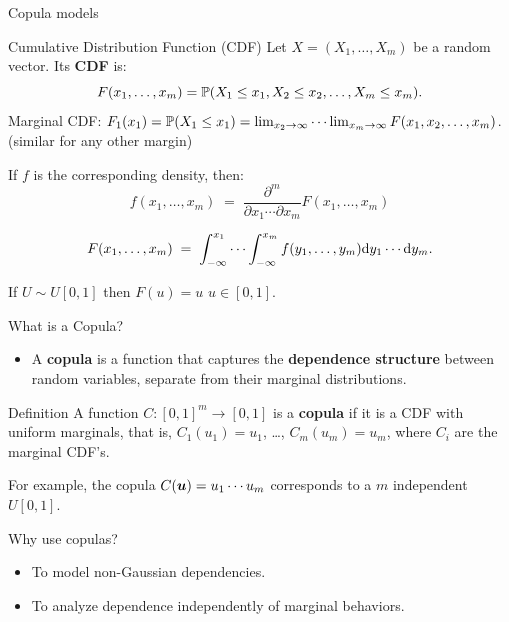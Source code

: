 \documentclass[11pt,handout,aspectratio=169]{beamer}
\begin{document}
\begin{frame}{}
	\begin{center}
		{\Huge \alert{Copula models}}
	\end{center}
\end{frame}

\begin{frame}{Cumulative Distribution Function (CDF)}
	Let $X=(X_1,\ldots,X_m)$ be a random vector.  Its \textbf{CDF} is: $$F(x_1,\ldots,x_m)=\P(X_1\leq x_1,X_2\leq x_2,\ldots,X_m\leq x_m).$$
	Marginal CDF: $F_1(x_1)=\P(X_1\leq x_1)=\lim_{x_2\to \infty}\cdots\lim_{x_m\to\infty}F(x_1,x_2,\ldots,x_m)$.
	(similar for any other margin)\\[5mm]	
	\begin{block}{}
	If $f$ is the corresponding density, then:
	$$
	f(x_1,\ldots,x_m)\;=\;\frac{\partial^m}{\partial x_1\cdots\partial x_m}F(x_1,\ldots,x_m)
	$$
	
	$$
	F(x_1,\ldots,x_m)\;=\;\int_{-\infty}^{x_1}\cdots \int_{-\infty}^{x_m} f(y_1,\ldots,y_m){\rm d}y_1\cdots {\rm d} y_m. 
	$$		
	\end{block}
		If $U\sim U[0,1]$ then $F(u)=u$ $u\in [0,1]$.

\end{frame}


\begin{frame}{What is a Copula?}
\begin{itemize}
    \item A \textbf{copula} is a function that captures the \textbf{dependence structure} between random variables, separate from their marginal distributions.
\end{itemize}
\begin{alertblock}{Definition}
	A function $C : [0, 1]^m \to [0, 1]$ is a \textbf{copula} if it is a CDF with uniform marginals, that is, $C_1(u_1)=u_1$, \ldots, $C_m(u_m)=u_m$, where $C_i$ are the marginal CDF's.
\end{alertblock}
For example, the copula $C(\bs u)=u_1\cdots u_m$ corresponds to a $m$ independent $U[0,1]$.
\begin{block}{Why use copulas?}
	\begin{itemize}
        \item To model non-Gaussian dependencies.
        \item To analyze dependence independently of marginal behaviors.
    \end{itemize}
\end{block}
\end{frame}
\end{document}
